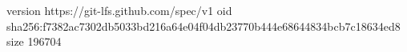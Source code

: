 version https://git-lfs.github.com/spec/v1
oid sha256:f7382ac7302db5033bd216a64e04f04db23770b444e68644834bcb7c18634ed8
size 196704
